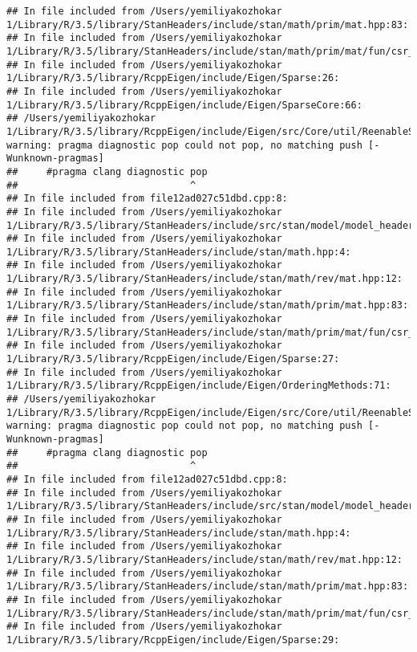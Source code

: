 \documentclass[]{article}
\begin{document}
\begin{verbatim}
## In file included from /Users/yemiliyakozhokar 1/Library/R/3.5/library/StanHeaders/include/stan/math/prim/mat.hpp:83:
## In file included from /Users/yemiliyakozhokar 1/Library/R/3.5/library/StanHeaders/include/stan/math/prim/mat/fun/csr_extract_u.hpp:6:
## In file included from /Users/yemiliyakozhokar 1/Library/R/3.5/library/RcppEigen/include/Eigen/Sparse:26:
## In file included from /Users/yemiliyakozhokar 1/Library/R/3.5/library/RcppEigen/include/Eigen/SparseCore:66:
## /Users/yemiliyakozhokar 1/Library/R/3.5/library/RcppEigen/include/Eigen/src/Core/util/ReenableStupidWarnings.h:10:30: warning: pragma diagnostic pop could not pop, no matching push [-Wunknown-pragmas]
##     #pragma clang diagnostic pop
##                              ^
## In file included from file12ad027c51dbd.cpp:8:
## In file included from /Users/yemiliyakozhokar 1/Library/R/3.5/library/StanHeaders/include/src/stan/model/model_header.hpp:4:
## In file included from /Users/yemiliyakozhokar 1/Library/R/3.5/library/StanHeaders/include/stan/math.hpp:4:
## In file included from /Users/yemiliyakozhokar 1/Library/R/3.5/library/StanHeaders/include/stan/math/rev/mat.hpp:12:
## In file included from /Users/yemiliyakozhokar 1/Library/R/3.5/library/StanHeaders/include/stan/math/prim/mat.hpp:83:
## In file included from /Users/yemiliyakozhokar 1/Library/R/3.5/library/StanHeaders/include/stan/math/prim/mat/fun/csr_extract_u.hpp:6:
## In file included from /Users/yemiliyakozhokar 1/Library/R/3.5/library/RcppEigen/include/Eigen/Sparse:27:
## In file included from /Users/yemiliyakozhokar 1/Library/R/3.5/library/RcppEigen/include/Eigen/OrderingMethods:71:
## /Users/yemiliyakozhokar 1/Library/R/3.5/library/RcppEigen/include/Eigen/src/Core/util/ReenableStupidWarnings.h:10:30: warning: pragma diagnostic pop could not pop, no matching push [-Wunknown-pragmas]
##     #pragma clang diagnostic pop
##                              ^
## In file included from file12ad027c51dbd.cpp:8:
## In file included from /Users/yemiliyakozhokar 1/Library/R/3.5/library/StanHeaders/include/src/stan/model/model_header.hpp:4:
## In file included from /Users/yemiliyakozhokar 1/Library/R/3.5/library/StanHeaders/include/stan/math.hpp:4:
## In file included from /Users/yemiliyakozhokar 1/Library/R/3.5/library/StanHeaders/include/stan/math/rev/mat.hpp:12:
## In file included from /Users/yemiliyakozhokar 1/Library/R/3.5/library/StanHeaders/include/stan/math/prim/mat.hpp:83:
## In file included from /Users/yemiliyakozhokar 1/Library/R/3.5/library/StanHeaders/include/stan/math/prim/mat/fun/csr_extract_u.hpp:6:
## In file included from /Users/yemiliyakozhokar 1/Library/R/3.5/library/RcppEigen/include/Eigen/Sparse:29:

\end{verbatim}
\end{document}
